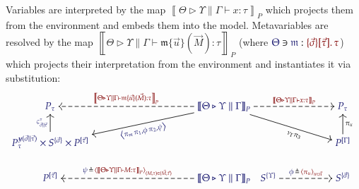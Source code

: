 \documentclass[11pt]{article}
\theoremstyle{definition}
\theoremstyle{remark}
\numberwithin{equation}{section}
\def\IModeColorName{MidnightBlue}
\def\OModeColorName{Maroon}
\newcommand\IMode[1]{{\color{\IModeColorName}{#1}}}
\newcommand\OMode[1]{{\color{\OModeColorName}{#1}}}
\newcommand\MkValence[3]{%
  \ifthenelse{\equal{#1}{}}{}{%
    \{#1\}%
  }%
  \ifthenelse{\equal{#2}{}}{}{%
    [#2]%
  }.\, #3%
}
\newcommand\Lookup[3]{\IMode{#1}\ni\IMode{#2}:\OMode{#3}}
\newcommand\Tuple[1]{\left\langle#1 \right\rangle}
\newcommand\MV[1]{\mathfrak{#1}}
\newcommand\MApp[3]{#1\{#2\}(#3)}
\newcommand\Define[2]{\IMode{#1}\triangleq\OMode{#2}}
\newcommand\SemBrackets[1]{\left\llbracket#1\right\rrbracket}
\newcommand\Yoneda[1]{\boldsymbol{y} (#1)}
\begin{document}
Variables are interpreted by the map
${\SemBrackets{
  \Theta\triangleright\Upsilon\parallel\Gamma\vdash x:\tau
}}_{P}$ which
projects them from the environment and embeds them into the model. Metavariables
are resolved by the map
${\SemBrackets{
  \Theta\triangleright\Upsilon\parallel\Gamma\vdash\MApp{\MV{m}}{\vec{u}}{\vec{M}}
  : \tau
}}_{P}$ (where
$\Lookup{\Theta}{\MV{m}}{\MkValence{\vec{\sigma}}{\vec{\tau}}{\tau}}$) which
projects their interpretation from the environment and instantiates it via
substitution:
\[
  \begin{tikzcd}[cramped, ampersand replacement = \&]
    {\IMode{P_\tau}}
\&[8.0em]
    {\IMode{
      {\SemBrackets{
        \Theta\triangleright\Upsilon\parallel\Gamma
      }}_{P}
    }}
      \arrow[
        , rr
        , dashed
        , "
          \OMode{
            {\SemBrackets{
              \Theta\triangleright\Upsilon\parallel\Gamma
              \vdash
              x:\tau
            }}_{P}
          }
          "
      ]
      \ar{drr}[
        , rotate = -16.5
        , xshift = +1.5em
        , yshift = -0.2em
        , swap
      ]{
        {\nu}_{\Gamma} {\pi}_{3}
      }
      \ar{dl}[
        , rotate = +11.5
        , xshift = -2.75em
      ]{
        \IMode{
          \Tuple{
            \pi_\MV{m}\,
            \pi_1,
            \phi\,
            \pi_2,
            \psi
          }
        }
      }
      \arrow[
        , l
        , dashed
        , swap
        , "
          \OMode{
            {\SemBrackets{
              \Theta\triangleright\Upsilon\parallel\Gamma
              \vdash
              \MApp{\MV{m}}{\vec{u}}{\vec{M}}: \tau
            }}_{P}
          }"
      ]
\&[-2.0em]
    \null
\&[+3.0em]
    {\IMode{P_\tau}}
\\
    {\IMode{
      {P}_{\tau}^{
        \Yoneda{\vec{\sigma}\parallel\vec{\tau}}
      }
      \times S^{\{\vec{\sigma}\}}
      \times P^{[\vec{\tau}]}
    }}
      \arrow[
        , u
        , "
          \IMode{
            \varsigma^\tau_{\vec{\sigma}\parallel\vec{\tau}}
          }
          "
        ]
\&
    \null
\&
    \null
\&
    {\IMode{P^{[\Gamma]}}}
      \arrow[
        , u
        , swap
        , "{\pi}_{x}"
      ]
\\
    {\IMode{P^{[\vec{\tau}]}}}
\&
    {\IMode{
      {\SemBrackets{
        \Theta\triangleright\Upsilon\parallel\Gamma
      }}_{P}
    }}
      \arrow[
        , dashed
        , l
        , swap
        , "
          \Define{
            \psi\,
          }{
            \,\Tuple{
              {\SemBrackets{
                \Theta\triangleright\Upsilon\parallel\Gamma\vdash M:\tau
              }}_{P}
            }_{(M,\tau)\in (\vec{M},\vec{\tau})}
          }
          "]
\&
    {\IMode{S^{\{\Upsilon\}}}}
      \arrow[
        , dashed
        , r
        , "\Define{\phi\,}{\,\Tuple{\pi_u}_{u\in\vec{u}}}"
      ]
\&
    {\IMode{S^{\{\vec{\sigma}\}}}}
  \end{tikzcd}
\]
\end{document}
